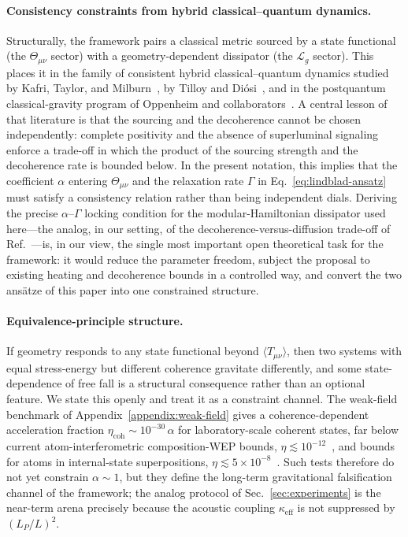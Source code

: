 \documentclass[aps,prd,twocolumn,superscriptaddress,nofootinbib,floatfix]{revtex4-2}
\newcommand{\Tmn}{\Theta_{\mu\nu}}
\begin{document}
\paragraph{Consistency constraints from hybrid classical--quantum dynamics.}
Structurally, the framework pairs a classical metric sourced by a state functional (the $\Tmn$ sector) with a geometry-dependent dissipator (the $\mathcal{L}_g$ sector). This places it in the family of consistent hybrid classical--quantum dynamics studied by Kafri, Taylor, and Milburn~\cite{KafriTaylorMilburn2014}, by Tilloy and Di\'{o}si~\cite{TilloyDiosi2016}, and in the postquantum classical-gravity program of Oppenheim and collaborators~\cite{Oppenheim2023,OppenheimEtAl2023}. A central lesson of that literature is that the sourcing and the decoherence cannot be chosen independently: complete positivity and the absence of superluminal signaling~\cite{Gisin1990} enforce a trade-off in which the product of the sourcing strength and the decoherence rate is bounded below. In the present notation, this implies that the coefficient $\alpha$ entering $\Tmn$ and the relaxation rate $\Gamma$ in Eq.~\eqref{eq:lindblad-ansatz} must satisfy a consistency relation rather than being independent dials. Deriving the precise $\alpha$--$\Gamma$ locking condition for the modular-Hamiltonian dissipator used here---the analog, in our setting, of the decoherence-versus-diffusion trade-off of Ref.~\cite{OppenheimEtAl2023}---is, in our view, the single most important open theoretical task for the framework: it would reduce the parameter freedom, subject the proposal to existing heating and decoherence bounds in a controlled way, and convert the two ansätze of this paper into one constrained structure.

\paragraph{Equivalence-principle structure.}
If geometry responds to any state functional beyond $\langle T_{\mu\nu}\rangle$, then two systems with equal stress-energy but different coherence gravitate differently, and some state-dependence of free fall is a structural consequence rather than an optional feature. We state this openly and treat it as a constraint channel. The weak-field benchmark of Appendix~\ref{appendix:weak-field} gives a coherence-dependent acceleration fraction $\eta_{\mathrm{coh}} \sim 10^{-30}\,\alpha$ for laboratory-scale coherent states, far below current atom-interferometric composition-WEP bounds, $\eta \lesssim 10^{-12}$~\cite{Asenbaum2020}, and bounds for atoms in internal-state superpositions, $\eta \lesssim 5\times10^{-8}$~\cite{Rosi2017}. Such tests therefore do not yet constrain $\alpha \sim 1$, but they define the long-term gravitational falsification channel of the framework; the analog protocol of Sec.~\ref{sec:experiments} is the near-term arena precisely because the acoustic coupling $\kappa_{\mathrm{eff}}$ is not suppressed by $(L_P/L)^2$.
\end{document}
